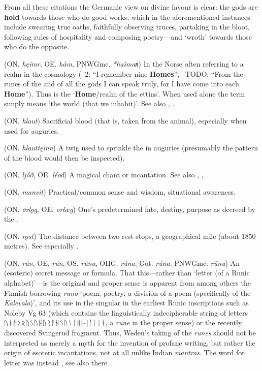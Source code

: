 \begin{itemize}
  From all these citations the Germanic view on divine favour is clear: the gods are \textbf{hold} towards those who do good works, which in the aforementioned instances include swearing true oaths, faithfully observing truces, partaking in the bloot, following rules of hospitality and composing poetry—and  ‘wroth’ towards those who do the opposite.

 (ON. \emph{hęimr}, OE. \emph{hám}, PNWGmc. \emph{*haimaʀ})
  In the Norse often referring to a realm in the cosmology (\Voluspa\ 2: “I remember nine \textbf{Homes}”, \Vafthrudnismal\ TODO: “From the runes of the  and of all the gods I can speak truly, for I have come into each \textbf{Home}”). Thus  is the ‘\textbf{Home}/realm of the ettins’. When used alone the term simply means ‘the world (that we inhabit)’. See also , .

 (ON. \emph{hlaut})
  Sacrificial blood (that is, taken from the animal), especially when used for auguries.

 (ON. \emph{hlauttęinn})
  A twig used to sprinkle the  in auguries (presumably the pattern of the blood would then be inspected).

 (ON. \emph{ljóð}, OE. \emph{léod})
  A magical chant or incantation. See also , , .

 (ON. \emph{manvit})
  Practical/common sense and wisdom, situational awareness.

 (ON. \emph{ørlǫg}, OE. \emph{orlæg})
  One’s predetermined fate, destiny, purpose as decreed by the .

 (ON. \emph{rǫst})
  The distance between two rest-stops, a geographical mile (about 1850 metres). See especially \CV.

 (ON. \emph{rún}, OE. \emph{rún}, OS. \emph{rúna}, OHG. \emph{rúna}, Got. \emph{rúna}, PNWGmc. \emph{rūnu})
  An (esoteric) secret message or formula. That this—rather than ‘letter (of a Runic alphabet)’—is the original and proper sense is apparent from among others the Finnish borrowing \emph{runo} ‘poem; poetry; a division of a poem (specifically of the \emph{Kalevala})’, and its use in the singular in the earliest Runic inscriptions such as Noleby Vg 63 (which contains the linguistically indecipherable string of letters {ᚢᚾᚨᚦᛟᚢᛊᚢᚺᚢᚱᚨᚺᛊᚢᛊᛁᚺ[--]ᚨᛁᛁᚾ}, a \emph{rune} in the proper sense) or the recently discovered Svingerud fragment. Thus, Weden’s taking of the \emph{runes} should not be interpreted as merely a myth for the invention of profane writing, but rather the origin of esoteric incantations, not at all unlike Indian \emph{mantras}.
  The word for letter was instead , see also there.


\end{itemize}
